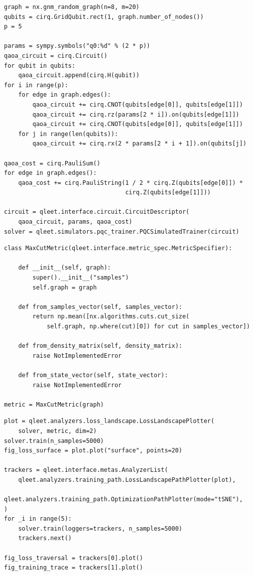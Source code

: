 \begin{lstlisting}
graph = nx.gnm_random_graph(n=8, m=20)
qubits = cirq.GridQubit.rect(1, graph.number_of_nodes())
p = 5

params = sympy.symbols("q0:%d" % (2 * p))
qaoa_circuit = cirq.Circuit()
for qubit in qubits:
    qaoa_circuit.append(cirq.H(qubit))
for i in range(p):
    for edge in graph.edges():
        qaoa_circuit += cirq.CNOT(qubits[edge[0]], qubits[edge[1]])
        qaoa_circuit += cirq.rz(params[2 * i]).on(qubits[edge[1]])
        qaoa_circuit += cirq.CNOT(qubits[edge[0]], qubits[edge[1]])
    for j in range(len(qubits)):
        qaoa_circuit += cirq.rx(2 * params[2 * i + 1]).on(qubits[j])

qaoa_cost = cirq.PauliSum()
for edge in graph.edges():
    qaoa_cost += cirq.PauliString(1 / 2 * cirq.Z(qubits[edge[0]]) * 
                                  cirq.Z(qubits[edge[1]]))

circuit = qleet.interface.circuit.CircuitDescriptor(
    qaoa_circuit, params, qaoa_cost)
solver = qleet.simulators.pqc_trainer.PQCSimulatedTrainer(circuit)
\end{lstlisting}

\begin{lstlisting}
class MaxCutMetric(qleet.interface.metric_spec.MetricSpecifier):

    def __init__(self, graph):
        super().__init__("samples")
        self.graph = graph

    def from_samples_vector(self, samples_vector):
        return np.mean([nx.algorithms.cuts.cut_size(
            self.graph, np.where(cut)[0]) for cut in samples_vector])
    
    def from_density_matrix(self, density_matrix):
        raise NotImplementedError
    
    def from_state_vector(self, state_vector):
        raise NotImplementedError

metric = MaxCutMetric(graph)
\end{lstlisting}

\begin{lstlisting}
plot = qleet.analyzers.loss_landscape.LossLandscapePlotter(
    solver, metric, dim=2)
solver.train(n_samples=5000)
fig_loss_surface = plot.plot("surface", points=20)

trackers = qleet.interface.metas.AnalyzerList(
    qleet.analyzers.training_path.LossLandscapePathPlotter(plot),
    qleet.analyzers.training_path.OptimizationPathPlotter(mode="tSNE"),
)
for _i in range(5):
    solver.train(loggers=trackers, n_samples=5000)
    trackers.next()
    
fig_loss_traversal = trackers[0].plot()
fig_training_trace = trackers[1].plot()
\end{lstlisting}

